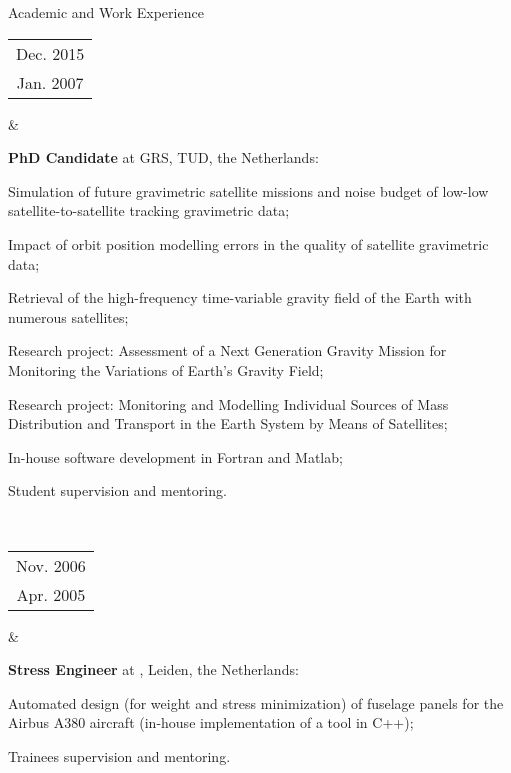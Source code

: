 \documentclass[a4paper,12pt]{article}
\newcommand{\dynhref}[2]{%
  \iftoggle{expliciturl}{%
    #2 \footnote{\href{http://#1}{\detokenize{#1}}}%
  }{%
    \href{http://#1}{#2}%
  }%
}
\begin{document}
\begin{cvsection}{Academic and Work Experience}
\begin{tabular}{c}
Dec. 2015 \\
Jan. 2007 \\ 
\end{tabular} 
&
  \begin{itti}
    \item \textbf{PhD Candidate} at \ac{GRS}, \ac{TUD}, the Netherlands:
    \begin{ittib}
      \item Simulation of future gravimetric satellite missions and noise budget of low-low satellite-to-satellite tracking gravimetric data;
      \item Impact of orbit position modelling errors in the quality of satellite gravimetric data;
      \item Retrieval of the high-frequency time-variable gravity field of the Earth with numerous satellites;
      \item Research project: Assessment of a Next Generation Gravity Mission for Monitoring the Variations of Earth's Gravity Field;
      \item Research project: Monitoring and Modelling Individual Sources of Mass Distribution and Transport in the Earth System by Means of Satellites;
      \item In-house software development in Fortran and Matlab;
      \item Student supervision and mentoring.
    \end{ittib}
  \end{itti}\\

\begin{tabular}{c}
Nov. 2006 \\
Apr. 2005 \\ 
\end{tabular} 
&
  \begin{itti}
    \item \textbf{Stress Engineer} at \dynhref{www.globaltechnics.nl/}{Global Technics}, Leiden, the Netherlands:
    \begin{ittib}
      \item Automated design (for weight and stress minimization) of fuselage panels for the Airbus A380 aircraft (in-house implementation of a tool in C++);
      \item Trainees supervision and mentoring.
    \end{ittib}
  \end{itti}\\


\end{cvsection}
\end{document}
